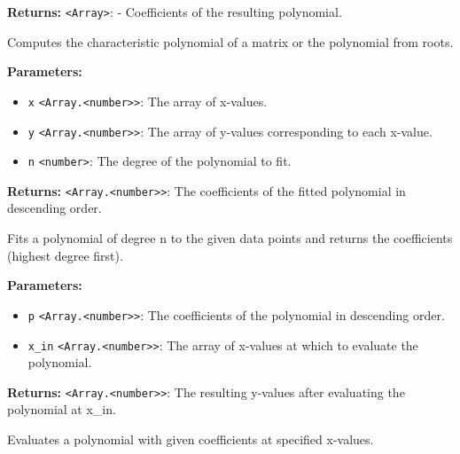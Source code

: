 \documentclass[12pt,a4paper]{article}
\begin{document}
\noindent \textbf{Returns:} \texttt{<Array>}: - Coefficients of the resulting polynomial.

\noindent Computes the characteristic polynomial of a matrix or the polynomial from roots.

\vspace{5mm}
\noindent {}


\noindent \textbf{Parameters:}
\begin{itemize}
  \item \texttt{x} \texttt{<Array.<number>>}: The array of x-values.
  \item \texttt{y} \texttt{<Array.<number>>}: The array of y-values corresponding to each x-value.
  \item \texttt{n} \texttt{<number>}: The degree of the polynomial to fit.
\end{itemize}

\noindent \textbf{Returns:} \texttt{<Array.<number>>}: The coefficients of the fitted polynomial in descending order.

\noindent Fits a polynomial of degree n to the given data points and returns the coefficients (highest degree first).

\vspace{5mm}
\noindent {}


\noindent \textbf{Parameters:}
\begin{itemize}
  \item \texttt{p} \texttt{<Array.<number>>}: The coefficients of the polynomial in descending order.
  \item \texttt{x\_in} \texttt{<Array.<number>>}: The array of x-values at which to evaluate the polynomial.
\end{itemize}

\noindent \textbf{Returns:} \texttt{<Array.<number>>}: The resulting y-values after evaluating the polynomial at x\_in.

\noindent Evaluates a polynomial with given coefficients at specified x-values.

\vspace{5mm}
\noindent {}
\end{document}
